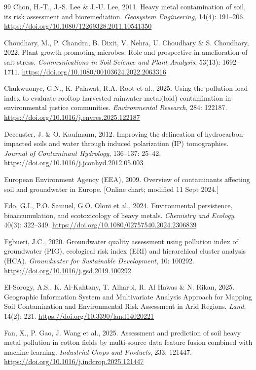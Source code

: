 \documentclass[sn-mathphys-num]{sn-jnl}
\begin{document}
\begin{thebibliography}{99}
Chon, H.-T., J.-S. Lee \& J.-U. Lee, 2011.
Heavy metal contamination of soil, its risk assessment and bioremediation.
\textit{Geosystem Engineering}, 14(4): 191--206.
\url{https://doi.org/10.1080/12269328.2011.10541350}

Choudhary, M., P. Chandra, B. Dixit, V. Nehra, U. Choudhary \& S. Choudhary,
2022.
Plant growth-promoting microbes: Role and prospective in amelioration of salt
stress.
\textit{Communications in Soil Science and Plant Analysis},
53(13): 1692--1711.
\url{https://doi.org/10.1080/00103624.2022.2063316}

Chukwuonye, G.N., K. Palawat, R.A. Root et al., 2025.
Using the pollution load index to evaluate rooftop harvested rainwater
metal(loid) contamination in environmental justice communities.
\textit{Environmental Research}, 284: 122187.
\url{https://doi.org/10.1016/j.envres.2025.122187}

Deceuster, J. \& O. Kaufmann, 2012.
Improving the delineation of hydrocarbon-impacted soils and water through
induced polarization (IP) tomographies.
\textit{Journal of Contaminant Hydrology}, 136--137: 25--42.
\url{https://doi.org/10.1016/j.jconhyd.2012.05.003}

European Environment Agency (EEA), 2009.
Overview of contaminants affecting soil and groundwater in Europe.
[Online chart; modified 11 Sept 2024.]

Edo, G.I., P.O. Samuel, G.O. Oloni et al., 2024.
Environmental persistence, bioaccumulation, and ecotoxicology of heavy
metals.
\textit{Chemistry and Ecology}, 40(3): 322--349.
\url{https://doi.org/10.1080/02757540.2024.2306839}

Egbueri, J.C., 2020.
Groundwater quality assessment using pollution index of groundwater (PIG),
ecological risk index (ERI) and hierarchical cluster analysis (HCA).
\textit{Groundwater for Sustainable Development}, 10: 100292.
\url{https://doi.org/10.1016/j.gsd.2019.100292}

El-Sorogy, A.S., K. Al-Kahtany, T. Alharbi, R. Al Hawas \& N. Rikan, 2025.
Geographic Information System and Multivariate Analysis Approach for Mapping
Soil Contamination and Environmental Risk Assessment in Arid Regions.
\textit{Land}, 14(2): 221.
\url{https://doi.org/10.3390/land14020221}

Fan, X., P. Gao, J. Wang et al., 2025.
Assessment and prediction of soil heavy metal pollution in cotton fields by
multi-source data feature fusion combined with machine learning.
\textit{Industrial Crops and Products}, 233: 121447.
\url{https://doi.org/10.1016/j.indcrop.2025.121447}


\end{thebibliography}
\end{document}
